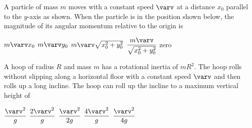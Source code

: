 \documentclass{../../oss-classkick-exam}
\begin{document}
\genheader


\genmultidirections

\gengravity

\raggedcolumns
\begin{multicols*}{2}
  \begin{questions}
    \question A particle of mass $m$ moves with a constant speed $\varv$ at a
    distance $x_0$ parallel to the $y$-axis as shown. When the particle is in
    the position shown below, the magnitude of its angular momentum relative to
    the origin is
    \begin{center}
    \end{center}
    \begin{choices}
      \choice $m\varv x_0$
      \choice $m\varv y_0$
      \choice $m\varv\sqrt{x_0^2+y_0^2}$
      \choice $\dfrac{m\varv}{\sqrt{x_0^2+y_0^2}}$
      \choice zero
    \end{choices}
    
    \question A hoop of radius $R$ and mass $m$ has a rotational inertia of
    $mR^2$. The hoop rolls without slipping along a horizontal floor with a
    constant speed $\varv$ and then rolls up a long incline. The hoop can roll
    up the incline to a maximum vertical height of
    \begin{center}
    \end{center}
    \begin{choices}
      \choice$\dfrac{\varv^2}g$
      \choice$\dfrac{2\varv^2}{g}$
      \choice$\dfrac{\varv^2}{2g}$
      \choice$\dfrac{4\varv^2}{g}$
      \choice$\dfrac{\varv^2}{4g}$
    \end{choices}
    

\end{questions}
\end{multicols*}
\end{document}

